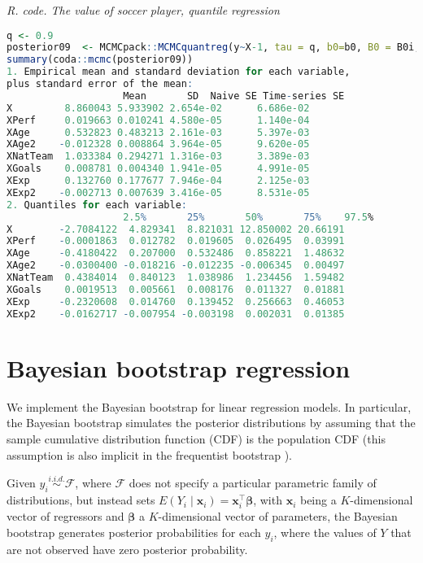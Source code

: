 \begin{tcolorbox}[enhanced,width=4.67in,center upper,
	fontupper=\large\bfseries,drop shadow southwest,sharp corners]
	\textit{R. code. The value of soccer player, quantile regression}
	\begin{VF}
		\begin{lstlisting}[language=R]
q <- 0.9
posterior09  <- MCMCpack::MCMCquantreg(y~X-1, tau = q, b0=b0, B0 = B0i, burnin = burnin, mcmc = mcmc, thin = thin, below = 13.82, above = Inf)
summary(coda::mcmc(posterior09))
1. Empirical mean and standard deviation for each variable,
plus standard error of the mean:
					Mean       SD  Naive SE Time-series SE
X         8.860043 5.933902 2.654e-02      6.686e-02
XPerf     0.019663 0.010241 4.580e-05      1.140e-04
XAge      0.532823 0.483213 2.161e-03      5.397e-03
XAge2    -0.012328 0.008864 3.964e-05      9.620e-05
XNatTeam  1.033384 0.294271 1.316e-03      3.389e-03
XGoals    0.008781 0.004340 1.941e-05      4.991e-05
XExp      0.132760 0.177677 7.946e-04      2.125e-03
XExp2    -0.002713 0.007639 3.416e-05      8.531e-05
2. Quantiles for each variable:
					2.5%       25%       50%       75%    97.5%
X        -2.7084122  4.829341  8.821031 12.850002 20.66191
XPerf    -0.0001863  0.012782  0.019605  0.026495  0.03991
XAge     -0.4180422  0.207000  0.532486  0.858221  1.48632
XAge2    -0.0300400 -0.018216 -0.012235 -0.006345  0.00497
XNatTeam  0.4384014  0.840123  1.038986  1.234456  1.59482
XGoals    0.0019513  0.005661  0.008176  0.011327  0.01881
XExp     -0.2320608  0.014760  0.139452  0.256663  0.46053
XExp2    -0.0162717 -0.007954 -0.003198  0.002031  0.01385
\end{lstlisting}
	\end{VF}
\end{tcolorbox} 

\section{Bayesian bootstrap regression}\label{sec610}

We implement the Bayesian bootstrap \cite{Rubin1981} for linear regression models. In particular, the Bayesian bootstrap simulates the posterior distributions by assuming that the sample cumulative distribution function (CDF) is the population CDF (this assumption is also implicit in the frequentist bootstrap \cite{Efron1979}).

Given $y_i \stackrel{i.i.d.}{\sim} \mathcal{F}$, where $\mathcal{F}$ does not specify a particular parametric family of distributions, but instead sets $E(Y_i \mid \bm{x}_i) = \bm{x}_i^{\top} \bm{\beta}$, with $\bm{x}_i$ being a $K$-dimensional vector of regressors and $\bm{\beta}$ a $K$-dimensional vector of parameters, the Bayesian bootstrap generates posterior probabilities for each $y_i$, where the values of $Y$ that are not observed have zero posterior probability.

